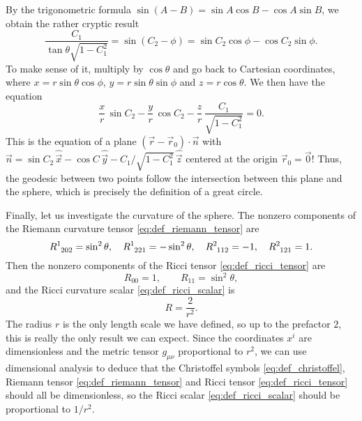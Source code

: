 \fi
By the trigonometric formula $\sin(A-B) = \sin A \cos B - \cos A \sin B$, we obtain the rather cryptic result
\begin{equation}
	\frac{C_1}{\tan \theta \sqrt{1 - C_1^2}} = \sin(C_2 - \phi) = \sin C_2 \cos \phi - \cos C_2 \sin \phi.
\end{equation}
To make sense of it, multiply by $\cos \theta$ and go back to Cartesian coordinates, where $x = r \sin\theta \cos\phi$, $y = r \sin\theta \sin\phi$ and $z = r \cos\theta$.
We then have the equation
\begin{equation}
	\frac{x}{r} \, \sin C_2 - \frac{y}{r} \, \cos C_2 - \frac{z}{r} \, \frac{C_1}{\sqrt{1 - C_1^2}} = 0.
\end{equation}
This is the equation of a plane $(\vec{r} - \vec{r}_0) \cdot \vec{n}$ with $\vec{n} = \sin C_2 \, \hat{\vec{x}} -\cos C \, \hat{\vec{y}} -C_1 / \sqrt{1 - C_1^2} \, \hat{\vec{z}}$ centered at the origin $\vec{r}_0 = \vec{0}$!
Thus, the geodesic between two points follow the intersection between this plane and the sphere, which is precisely the definition of a great circle.

Finally, let us investigate the curvature of the sphere.
The nonzero components of the Riemann curvature tensor \eqref{eq:def_riemann_tensor} are
\begin{equation}
	R\indices{^1_2_0_2} = \sin^2 \theta , \quad
	R\indices{^1_2_2_1} = -\sin^2 \theta , \quad
	R\indices{^2_1_1_2} = -1 , \quad
	R\indices{^2_1_2_1} = 1 .
\end{equation}
Then the nonzero components of the Ricci tensor \eqref{eq:def_ricci_tensor} are
\begin{equation}
	R_{00} = 1 , \qquad R_{11} = \sin^2 \theta ,
\end{equation}
and the Ricci curvature scalar \eqref{eq:def_ricci_scalar} is
\begin{equation}
	R = \frac{2}{r^2} .
\end{equation}
The radius $r$ is the only length scale we have defined, so up to the prefactor $2$, this is really the only result we can expect.
Since the coordinates $x^i$ are dimensionless and the metric tensor $g_{\mu \nu}$ proportional to $r^2$, we can use dimensional analysis to deduce that the Christoffel symbols \eqref{eq:def_christoffel}, Riemann tensor \eqref{eq:def_riemann_tensor} and Ricci tensor \eqref{eq:def_ricci_tensor} should all be dimensionless, so the Ricci scalar \eqref{eq:def_ricci_scalar} should be proportional to $1/r^2$.



